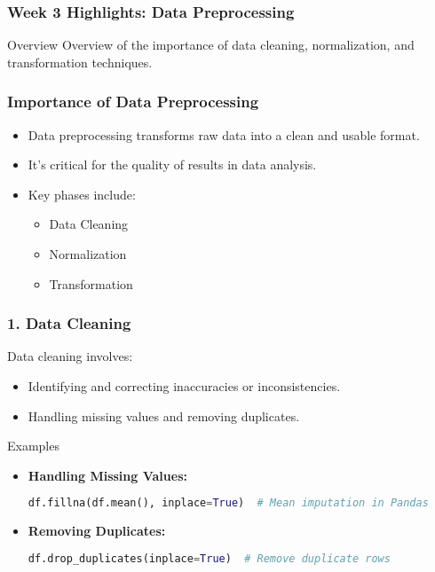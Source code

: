 \documentclass[aspectratio=169]{beamer}
\begin{document}
\begin{frame}[fragile]
    \frametitle{Week 3 Highlights: Data Preprocessing}
    \begin{block}{Overview}
        Overview of the importance of data cleaning, normalization, and transformation techniques.
    \end{block}
\end{frame}

\begin{frame}[fragile]
    \frametitle{Importance of Data Preprocessing}
    \begin{itemize}
        \item Data preprocessing transforms raw data into a clean and usable format.
        \item It's critical for the quality of results in data analysis.
        \item Key phases include:
        \begin{itemize}
            \item Data Cleaning
            \item Normalization
            \item Transformation
        \end{itemize}
    \end{itemize}
\end{frame}

\begin{frame}[fragile]
    \frametitle{1. Data Cleaning}
    Data cleaning involves:
    \begin{itemize}
        \item Identifying and correcting inaccuracies or inconsistencies.
        \item Handling missing values and removing duplicates.
    \end{itemize}

    \begin{block}{Examples}
        \begin{itemize}
            \item \textbf{Handling Missing Values:}
            \begin{lstlisting}[language=Python]
df.fillna(df.mean(), inplace=True)  # Mean imputation in Pandas
            \end{lstlisting}
            \item \textbf{Removing Duplicates:}
            \begin{lstlisting}[language=Python]
df.drop_duplicates(inplace=True)  # Remove duplicate rows
            \end{lstlisting}
        \end{itemize}
    \end{block}
\end{frame}
\end{document}
